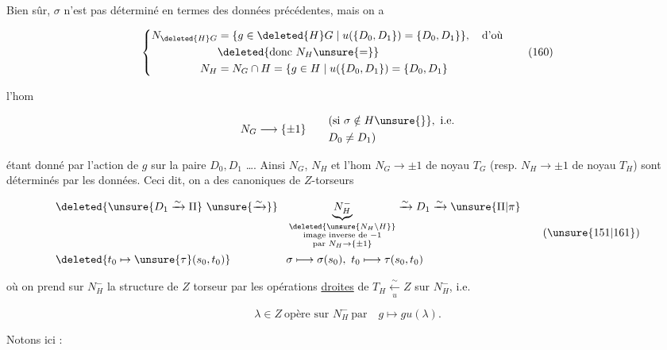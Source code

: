 

Bien sûr, $\sigma$ n'est pas déterminé en termes des données précédentes, mais on a

\[
\left\{\begin{aligned}
N_{\deleted{H}G}&=\{g\in\deleted{H}G\mid u(\{D_0,D_1\})=\{D_0,D_1\}\},\quad\text{d'où}\\
&\deleted{\text{donc }N_H\unsure{=}}\\
N_H&=N_G\cap H=\{g\in H\mid u(\{D_0,D_1\})=\{D_0,D_1\}
\end{aligned}\right.\tag*{(160)}
\]

l'hom

\[
N_G\longrightarrow\{\pm1\}\qquad
\begin{aligned}&(\text{si }\sigma\notin H\unsure{\}},\text{ i.e.}\\&D_0\ne D_1)\end{aligned}
\]

étant donné par l'action de $g$ sur la paire $D_0,D_1$ \ldots. Ainsi $N_G$, $N_H$ et l'hom $N_G\to\pm1$  de noyau $T_G$ (resp. $N_H\to\pm1$ de noyau $T_H$) sont déterminés par les données. Ceci dit, on a des  canoniques de $Z$-torseurs

\[
\begin{aligned}
&\deleted{\unsure{D_1\xrightarrow{\sim}\Pi}\ \unsure{\xrightarrow{\sim}}}\quad
\underset{\substack{\deleted{\unsure{N_H\setminus H}}\\\text{image inverse de }-1\\\text{par }N_H\to\{\pm1\}}}{\underbrace{N_H^-}}\xrightarrow{\sim}D_1\xrightarrow{\sim}\unsure{\Pi|\pi}\\
&\deleted{t_0\mapsto\unsure{\tau}(s_0,t_0)}\hspace{5em}
\sigma\longmapsto\sigma(s_0),\ t_0\longmapsto\tau(s_0,t_0)
\end{aligned}\tag*{(\unsure{151|161})}
\]

  où on prend sur $N_H^-$ la structure de $Z$ torseur  par les opérations \uline{droites} de $T_H\xleftarrow[u]{\sim}Z$ sur $N_H^-$, i.e. \deleted{\unsure{$\lambda$}}

\[
\lambda\in Z\ \text{opère sur }N_H^-\ \text{par}\quad g\longmapsto gu(\lambda).\tag*{(162)}
\]

Notons ici :

